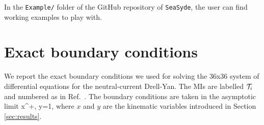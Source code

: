 \documentclass[final,1p,times]{elsarticle}
\begin{document}
In the \texttt{Example/} folder of the GitHub repository of \texttt{SeaSyde}, the user can find working examples to play with.



\section{Exact boundary conditions}
\label{app:exactbcs}
We report the exact boundary conditions we used for solving the 36x36 system of differential equations for the neutral-current Drell-Yan. The MIs are labelled $\mathcal{T}_i$ and numbered as in Ref.~\cite{Bonciani:2016ypc}. The boundary conditions are taken in the asymptotic limit 
\be
x^+\;, \qquad y=1,
\ee
where $x$ and $y$ are the kinematic variables introduced in Section \ref{sec:results}. 
\vspace*{3mm}


\vspace*{3mm}
\end{document}
